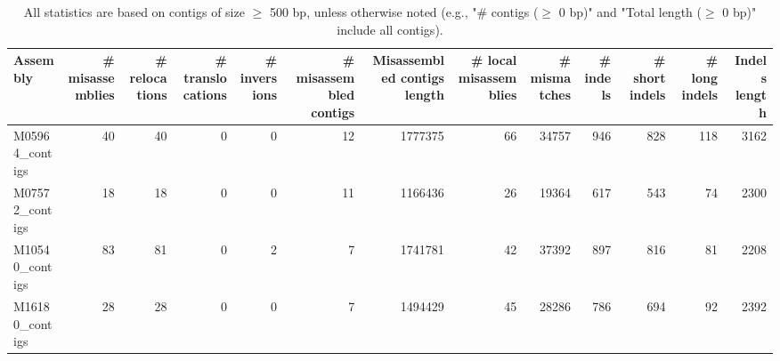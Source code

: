 \documentclass[12pt,a4paper]{article}
\begin{document}
\begin{table}[ht]
\begin{center}
\caption{All statistics are based on contigs of size $\geq$ 500 bp, unless otherwise noted (e.g., "\# contigs ($\geq$ 0 bp)" and "Total length ($\geq$ 0 bp)" include all contigs).}
\begin{tabular}{|l*{12}{|r}|}
\hline
Assembly & \# misassemblies &     \# relocations &     \# translocations &     \# inversions & \# misassembled contigs & Misassembled contigs length & \# local misassemblies & \# mismatches & \# indels &     \# short indels &     \# long indels & Indels length \\ \hline
M05964\_contigs & 40 & 40 & 0 & 0 & 12 & 1777375 & 66 & 34757 & 946 & 828 & 118 & 3162 \\ \hline
M07572\_contigs & 18 & 18 & 0 & 0 & 11 & 1166436 & 26 & 19364 & 617 & 543 & 74 & 2300 \\ \hline
M10540\_contigs & 83 & 81 & 0 & 2 & 7 & 1741781 & 42 & 37392 & 897 & 816 & 81 & 2208 \\ \hline
M16180\_contigs & 28 & 28 & 0 & 0 & 7 & 1494429 & 45 & 28286 & 786 & 694 & 92 & 2392 \\ \hline
\end{tabular}
\end{center}
\end{table}
\end{document}

